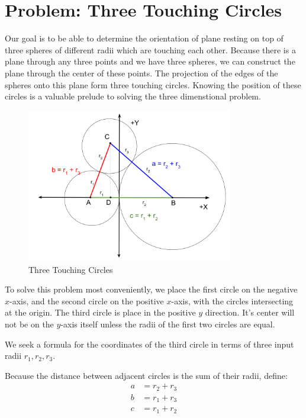 \documentclass{article}
\begin{document}
\section{Problem: Three Touching Circles}

Our goal is to be able to determine the orientation of plane resting on top of three spheres of different radii which are touching each
other.
Because there is a plane through any three points and we have three spheres, we can construct the plane through
the center of these points.
The projection of the edges of the spheres onto this plane form three touching circles.
Knowing the position of these circles is a valuable prelude to solving the three dimenstional problem.

\begin{figure}
     \centering
     \includegraphics[width=0.80\textwidth]{figures/ThreeTouchingCircles.png}
     \caption{Three Touching Circles}
  \label{fig:Tangent}
\end{figure}

To solve this problem most conveniently, we place the first circle on the negative $x$-axis, and the second circle
on the positive $x$-axis, with the circles intersecting at the origin.
The third circle is place in the positive $y$ direction. It's center will not be on the $y$-axis itself unless the
radii of the first two circles are equal.

We seek a formula for the coordinates of the third circle in terms of three input radii $r_1,r_2,r_3$.

Because the distance between adjacent circles is the sum of their radii, define:
\begin{align}
a  &= r_2 + r_3 \\
b  &= r_1 + r_3 \\
c  &= r_1 + r_2
\end{align}
\end{document}
